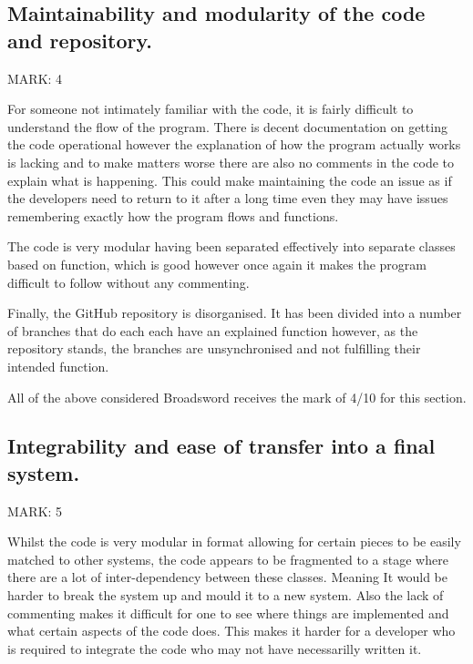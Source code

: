 \documentclass{article}
\begin{document}
\subsection{Maintainability and modularity of the code and repository.}

\begin{flushleft}
MARK: 4
\end{flushleft}

\begin{flushleft}
For someone not intimately familiar with the code, it is fairly difficult to understand the flow of the program. There is decent documentation on getting the code operational however the explanation of how the program actually works is lacking and to make matters worse there are also no comments in the code to explain what is happening. This could make maintaining the code an issue as if the developers need to return to it after a long time even they may have issues remembering exactly how the program flows and functions.
\end{flushleft}

\begin{flushleft}
The code is very modular having been separated effectively into separate classes based on function, which is good however once again it makes the program difficult to follow without any commenting.
\end{flushleft}

\begin{flushleft}
Finally, the GitHub repository is disorganised. It has been divided into a number of branches that do each each have an explained function however, as the repository stands, the branches are unsynchronised and not fulfilling their intended function.
\end{flushleft}

\begin{flushleft}
All of the above considered Broadsword receives the mark of 4/10 for this section.
\end{flushleft}

\subsection{Integrability and ease of transfer into a final system.}
\begin{flushleft}
MARK: 5
\end{flushleft}

\begin{flushleft}
Whilst the code is very modular in format allowing for certain pieces to be easily matched to other systems, the code appears to be fragmented to a stage where there are a lot of inter-dependency between these classes. Meaning It would be harder to break the system up and mould it to a new system. Also the lack of commenting makes it difficult for one to see where things are implemented and what certain aspects of the code does. This makes it harder for a developer who is required to integrate the code who may not have necessarilly written it.
\end{flushleft}
\end{document}
